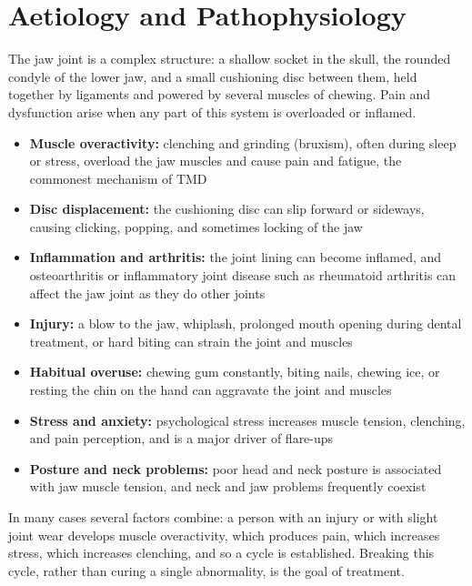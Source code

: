 \section*{Aetiology and Pathophysiology}
The jaw joint is a complex structure: a shallow socket in the skull, the rounded condyle of the lower jaw, and a small cushioning disc between them, held together by ligaments and powered by several muscles of chewing. Pain and dysfunction arise when any part of this system is overloaded or inflamed.

\begin{itemize}
    \item \textbf{Muscle overactivity:} clenching and grinding (bruxism), often during sleep or stress, overload the jaw muscles and cause pain and fatigue, the commonest mechanism of TMD
    \item \textbf{Disc displacement:} the cushioning disc can slip forward or sideways, causing clicking, popping, and sometimes locking of the jaw
    \item \textbf{Inflammation and arthritis:} the joint lining can become inflamed, and osteoarthritis or inflammatory joint disease such as rheumatoid arthritis can affect the jaw joint as they do other joints
    \item \textbf{Injury:} a blow to the jaw, whiplash, prolonged mouth opening during dental treatment, or hard biting can strain the joint and muscles
    \item \textbf{Habitual overuse:} chewing gum constantly, biting nails, chewing ice, or resting the chin on the hand can aggravate the joint and muscles
    \item \textbf{Stress and anxiety:} psychological stress increases muscle tension, clenching, and pain perception, and is a major driver of flare-ups
    \item \textbf{Posture and neck problems:} poor head and neck posture is associated with jaw muscle tension, and neck and jaw problems frequently coexist
\end{itemize}

In many cases several factors combine: a person with an injury or with slight joint wear develops muscle overactivity, which produces pain, which increases stress, which increases clenching, and so a cycle is established. Breaking this cycle, rather than curing a single abnormality, is the goal of treatment.


